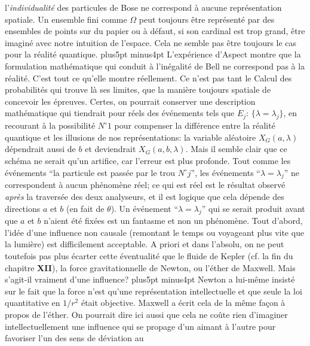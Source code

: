 l'{\it individualit\'e} des  particules de Bose ne  correspond \`a aucune 
repr\'esentation spatiale. Un ensemble fini comme $\Omega$ peut 
toujours \^etre repr\'esent\'e par des ensembles de points sur du papier  
ou \`a d\'efaut, si son cardinal est trop grand, \^etre imagin\'e avec 
notre intuition de l'espace.  Cela ne semble pas \^etre toujours le cas 
pour la r\'ealit\'e quantique.  
\vskip6pt plus5pt minus4pt 
L'exp\'erience d'Aspect montre que la formulation math\'ematique qui 
conduit \`a l'in\'egalit\'e de Bell ne correspond pas \`a la r\'ealit\'e.  
C'est tout ce qu'elle montre r\'eellement. Ce n'est pas tant le Calcul des  
probabilit\'es qui trouve l\`a ses limites, que la mani\`ere toujours  
spatiale de concevoir les \'epreuves. Certes, on pourrait conserver 
une description math\'ematique qui tiendrait pour r\'eels des  
\'ev\'enements tels que $E_j$: $\{ \lambda = \lambda_j \}$, en recourant
\`a la possibilit\'e $N^\circ 1$ pour compenser la diff\'erence entre  
la r\'ealit\'e quantique  et les illusions de nos repr\'esentations: 
la variable al\'eatoire $X_G(a,\lambda )$ d\'ependrait aussi de $b$ et 
deviendrait $X_G(a,b,\lambda )$. Mais  il semble clair que ce sch\'ema  
ne serait  qu'un artifice, car l'erreur est plus profonde. Tout 
comme les \'ev\'enements ``la particule est pass\'ee par le trou 
$N^\circ j$'', les \'ev\'enements ``$\lambda = \lambda_j$'' ne 
correspondent \`a aucun ph\'enom\`ene r\'eel; ce qui est r\'eel est le
r\'esultat observ\'e {\it apr\`es} la travers\'ee des deux analyseurs, 
et il est logique que cela d\'epende des directions $a$ et $b$ (en fait 
de $\theta$). Un \'ev\'enement ``$\lambda = \lambda_j$'' qui se serait 
produit avant que $a$ et $b$ n'aient \'et\'e fix\'ees est un fantasme et 
non un ph\'enom\`ene. Tout d'abord, l'id\'ee d'une influence non causale
(remontant le temps ou voyageant  plus vite que la lumi\`ere) est 
difficilement acceptable. A priori et dans l'absolu, on ne  peut toutefois 
pas plus \'ecarter cette \'eventualit\'e  que le fluide de Kepler (cf. la 
fin du chapitre {\bf XII}), la force gravitationnelle de Newton, ou l'\'ether
de Maxwell. Mais s'agit-il vraiment d'une influence?  
\vskip6pt plus5pt minus4pt 
Newton a lui-m\^eme insist\'e sur le fait que la force n'est qu'une 
repr\'e\-sen\-ta\-tion intellectuelle et que seule la loi quantitative en  
$1/r^2$ \'etait objective. Maxwell a \'ecrit cela de la m\^eme fa\c{c}on  
\`a propos  de l'\'ether. On pourrait dire ici aussi que cela ne co\^ute  
rien d'imaginer intellectuellement une influence qui se propage d'un 
aimant  \`a l'autre pour favoriser l'un des sens de d\'eviation au 
